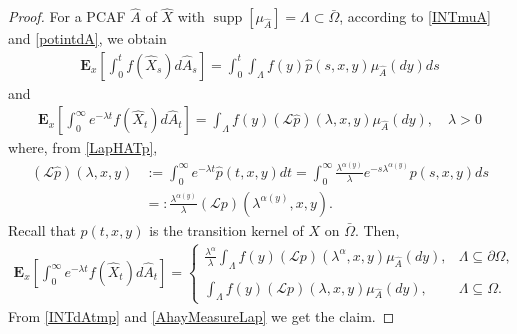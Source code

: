 \documentclass[10pt,a4paper]{amsart}
\begin{document}
\begin{proof}
For a PCAF $\hat{A}$ of $\hat{X}$ with $\operatorname{supp}[\mu_{\hat{A}}] = \Lambda \subset \bar{\Omega}$, according to \eqref{INTmuA} and \eqref{potintdA}, we obtain
\begin{align}
\label{AhatMeasure}
\mathbf{E}_x\left[\int_0^t f(\hat{X}_s) d\hat{A}_s \right] = \int_0^t \int_\Lambda f(y) \hat{p}(s,x,y) \mu_{\hat{A}}(dy) ds
\end{align}
and
\begin{align}
\label{AhayMeasureLap}
\mathbf{E}_x\left[ \int_0^\infty e^{-\lambda t} f(\hat{X}_t) d\hat{A}_t \right] = \int_\Lambda f(y) (\mathcal{L}\hat{p})(\lambda, x,y) \mu_{\hat{A}}(dy), \quad \lambda>0
\end{align}
where, from \eqref{LapHATp},
\begin{align*}
(\mathcal{L}\hat{p})(\lambda, x, y) 
& :=  \int_0^\infty e^{-\lambda t} \hat{p}(t,x,y) dt = \int_0^\infty \frac{\lambda^{\alpha(y)}}{\lambda} e^{-s\lambda^{\alpha(y)}} p(s,x,y) ds \\
& =: \frac{\lambda^{\alpha(y)}}{\lambda} (\mathcal{L}p)(\lambda^{\alpha(y)},x,y).
\end{align*}
Recall that $p(t,x,y)$ is the transition kernel of $X$ on $\bar{\Omega}$. 
Then,
\begin{align}
\label{INTdAtmp}
\mathbf{E}_x\left[\int_0^\infty e^{-\lambda t} f(\hat{X}_t) d\hat{A}_t \right] = 
\left\lbrace
\begin{array}{ll}
\displaystyle \frac{\lambda^\alpha}{\lambda} \int_\Lambda f(y) (\mathcal{L}p)(\lambda^\alpha, x,y) \mu_{\hat{A}}(dy), & \Lambda \subseteq \partial \Omega,\\ 
\\
\displaystyle \int_\Lambda f(y) (\mathcal{L}p)(\lambda, x,y) \mu_{\hat{A}}(dy), & \Lambda \subseteq \Omega.
\end{array}
\right.
\end{align}
From \eqref{INTdAtmp} and \eqref{AhayMeasureLap} we get the claim.
\end{proof}
\end{document}
